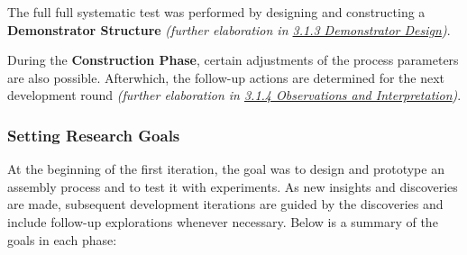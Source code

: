 \documentclass[11pt]{book}
\begin{document}
The full full systematic test was performed by designing and constructing a \textbf{Demonstrator Structure} \textit{(further elaboration in \uline{3.1.3 Demonstrator Design})}. 

During the \textbf{Construction Phase}, certain adjustments of the process parameters are also possible. Afterwhich, the follow-up actions are determined for the next development round\textbf{ }\textit{(further elaboration in \uline{3.1.4 Observations and Interpretation})}.

\subsubsection{Setting Research Goals}

At the beginning of the first iteration, the goal was to design and prototype an assembly process and to test it with experiments. As new insights and discoveries are made, subsequent development iterations are guided by the discoveries and include follow-up explorations whenever necessary. Below is a summary of the goals in each phase:
\end{document}
